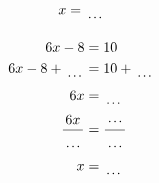 \documentclass[12pt]{article}
\newcounter{minipagecount}
\begin{document}
\begin{multicols}{2}
\begin{minipage}[t]{0.45\textwidth}
\begin{align*}
        x &= \dotuline{\hspace{5mm}}\\
    \end{align*}
\end{minipage} %
\noindent{(\theminipagecount)}\hspace{0.1mm} %
\begin{minipage}[t]{0.45\textwidth} %
    \vspace{-26pt}  %
    \raggedright %
    \begin{align*} %
        6x - 8 &= 10\\
        6x - 8 + \dotuline{\hspace{5mm}} &= 10 + \dotuline{\hspace{5mm}}\\
        6x &= \dotuline{\hspace{5mm}}\\
        \frac{6x}{\dotuline{\hspace{5mm}}} &= \frac{\dotuline{\hspace{5mm}}}{\dotuline{\hspace{5mm}}}\\
        x &= \dotuline{\hspace{5mm}}\\
    \end{align*}
\end{minipage} %
\noindent{(\theminipagecount)}\hspace{0.1mm} %
\begin{minipage}[t]{0.45\textwidth} %
    \vspace{-26pt}  %

\end{minipage}
\end{multicols}
\end{document}

